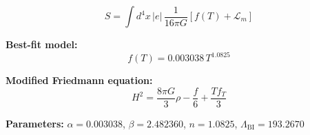 
\begin{equation}
  S = \int d^4x \, |e| \, \frac{1}{16\pi G} \left[ f(T) + \mathcal{L}_m \right]
\end{equation}

\textbf{Best-fit model:}
\begin{equation}
  f(T) = 0.003038 \, T^{1.0825}
\end{equation}

\textbf{Modified Friedmann equation:}
\begin{equation}
  H^2 = \frac{8\pi G}{3} \rho - \frac{f}{6} + \frac{T f_T}{3}
\end{equation}

\textbf{Parameters:}
$\alpha = 0.003038$, \quad
$\beta = 2.482360$, \quad
$n = 1.0825$, \quad
$\Lambda_{\text{BI}} = 193.2670$